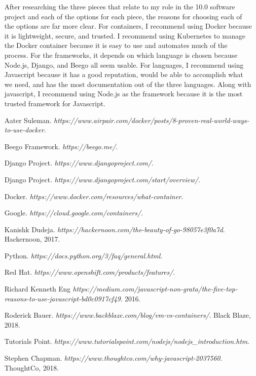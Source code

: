 \documentclass[letterpaper,10pt,draftclsnofoot,onecolumn,]{article}
\begin{document}
After researching the three pieces that relate to my role in the 10.0 software project and each of the options for each piece, the reasons for choosing each of the options are far more clear. For containers, I recommend using Docker because it is lightweight, secure, and trusted. I recommend using Kubernetes to manage the Docker container because it is easy to use and automates much of the process. For the frameworks, it depends on which language is chosen because Node.js, Django, and Beego all seem usable. For languages, I recommend using Javascript because it has a good reputation, would be able to accomplish what we need, and has the most documentation out of the three languages. Along with javascript, I recommend using Node.js as the framework because it is the most trusted framework for Javascript.

\pagebreak
\begin{thebibliography}{9}

Aater Suleman.
\textit{https://www.airpair.com/docker/posts/8-proven-real-world-ways-to-use-docker}. 

Beego Framework.
\textit{https://beego.me/}.

Django Project.
\textit{https://www.djangoproject.com/}. 

Django Project.
\textit{https://www.djangoproject.com/start/overview/}. 

Docker. 
\textit{https://www.docker.com/resources/what-container}. 

Google.
\textit{https://cloud.google.com/containers/}.

Kanishk Dudeja.
\textit{https://hackernoon.com/the-beauty-of-go-98057e3f0a7d}.
Hackernoon, 2017.

Python.
\textit{https://docs.python.org/3/faq/general.html}.

Red Hat.
\textit{https://www.openshift.com/products/features/}.

Richard Kenneth Eng
\textit{https://medium.com/javascript-non-grata/the-five-top-reasons-to-use-javascript-bd0c0917cf49}.
2016.

Roderick Bauer. 
\textit{https://www.backblaze.com/blog/vm-vs-containers/}. 
Black Blaze, 2018.

Tutorials Point.
\textit{https://www.tutorialspoint.com/nodejs/nodejs_introduction.htm}.

Stephen Chapman.
\textit{https://www.thoughtco.com/why-javascript-2037560}.
ThoughtCo, 2018.


\end{thebibliography}
\end{document}
